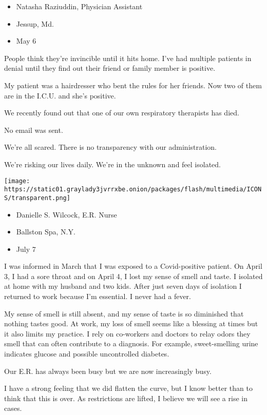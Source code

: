 \begin{itemize}
\tightlist
\item
  Natasha Raziuddin, Physician Assistant
\item
  Jessup, Md.
\item
  May 6
\end{itemize}

People think they're invincible until it hits home. I've had multiple
patients in denial until they find out their friend or family member is
positive.

My patient was a hairdresser who bent the rules for her friends. Now two
of them are in the I.C.U. and she's positive.

We recently found out that one of our own respiratory therapists has
died.

No email was sent.

We're all scared. There is no transparency with our administration.

We're risking our lives daily. We're in the unknown and feel isolated.

\texttt{[image: https://static01.graylady3jvrrxbe.onion/packages/flash/multimedia/ICONS/transparent.png]}

\begin{itemize}
\tightlist
\item
  Danielle S. Wilcock, E.R. Nurse
\item
  Ballston Spa, N.Y.
\item
  July 7
\end{itemize}

I was informed in March that I was exposed to a Covid-positive patient.
On April 3, I had a sore throat and on April 4, I lost my sense of smell
and taste. I isolated at home with my husband and two kids. After just
seven days of isolation I returned to work because I'm essential. I
never had a fever.

My sense of smell is still absent, and my sense of taste is so
diminished that nothing tastes good. At work, my loss of smell seems
like a blessing at times but it also limits my practice. I rely on
co-workers and doctors to relay odors they smell that can often
contribute to a diagnosis. For example, sweet-smelling urine indicates
glucose and possible uncontrolled diabetes.

Our E.R. has always been busy but we are now increasingly busy.

I have a strong feeling that we did flatten the curve, but I know better
than to think that this is over. As restrictions are lifted, I believe
we will see a rise in cases.

